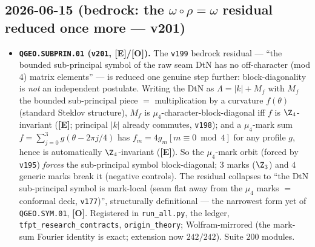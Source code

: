 \documentclass[11pt]{article}
\providecommand{\mE}{\textbf{[E]}}\providecommand{\mC}{\textbf{[C]}}
\providecommand{\mO}{\textbf{[O]}}\providecommand{\mX}{\textbf{[X]}}
\providecommand{\vref}[1]{\texttt{#1}}
\begin{document}
\subsection*{2026-06-15 (bedrock: the $\omega\circ\rho=\omega$ residual reduced once more --- v201)}
\begin{itemize}
\item \textbf{\texttt{QGEO.SUBPRIN.01} (\vref{v201}, \mE/\mO).} The \vref{v199} bedrock residual --- ``the
  bounded sub-principal symbol of the raw seam DtN has no off-character (mod 4) matrix elements'' --- is
  reduced one genuine step further: block-diagonality is \emph{not} an independent postulate. Writing the
  DtN as $\Lambda=|k|+M_f$ with $M_f$ the bounded sub-principal piece $=$ multiplication by a curvature
  $f(\theta)$ (standard Steklov structure), $M_f$ is $\mu_4$-character-block-diagonal iff $f$ is
  $\Z_4$-invariant (\mE; principal $|k|$ already commutes, \vref{v198}); and a $\mu_4$-mark sum
  $f=\sum_{j=0}^3 g(\theta-2\pi j/4)$ has $f_m=4g_m[m\equiv0\bmod4]$ for any profile $g$, hence is
  automatically $\Z_4$-invariant (\mE). So the $\mu_4$-mark orbit (forced by \vref{v195}) \emph{forces} the
  sub-principal symbol block-diagonal; $3$ marks ($\Z_3$) and $4$ generic marks break it (negative
  controls). The residual collapses to ``the DtN sub-principal symbol is mark-local (seam flat away from the
  $\mu_4$ marks $=$ conformal deck, \vref{v177})'', structurally definitional --- the narrowest form yet of
  \texttt{QGEO.SYM.01}, \mO. Registered in \texttt{run\_all.py}, the ledger, \texttt{tfpt\_research\_contracts},
  \texttt{origin\_theory}; Wolfram-mirrored (the mark-sum Fourier identity is exact; extension now
  $242/242$). Suite $200$ modules.
\end{itemize}
\end{document}
